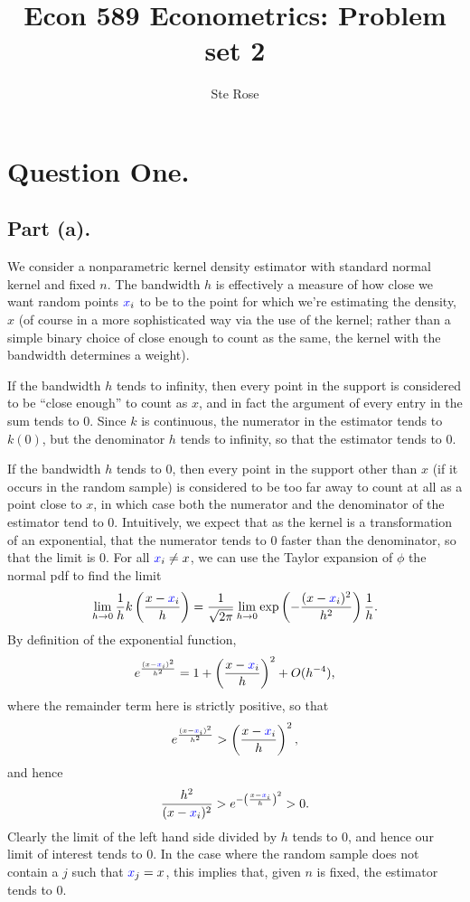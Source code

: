 \documentclass{article}
\title{Econ 589 Econometrics: Problem set 2}
\author{Ste Rose}
\renewcommand{\r}[1]{\textcolor{blue}{#1}}
\begin{document}
\newtheorem{claim}{Claim}
\newtheorem{thm}{Theorem}
\newtheorem{mydef}{Definition}
\maketitle

\section{Question One.}
\subsection{Part (a).}
We consider a nonparametric kernel density estimator with standard normal kernel and fixed $n$. The bandwidth $h$ is effectively a measure of how close we want random points $\r{x}_{i}$ to be to the point for which we're estimating the density, $x$ (of course in a more sophisticated way via the use of the kernel; rather than a simple binary choice of close enough to count as the same, the kernel with the bandwidth determines a weight).

If the bandwidth $h$ tends to infinity, then every point in the support is considered to be ``close enough'' to count as $x$, and in fact the argument of every entry in the sum tends to $0$. Since $k$ is continuous, the numerator in the estimator tends to $k(0)$, but the denominator $h$ tends to infinity, so that the estimator tends to 0.

If the bandwidth $h$ tends to 0, then every point in the support other than $x$ (if it occurs in the random sample) is considered to be too far away to count at all as a point close to $x$, in which case both the numerator and the denominator of the estimator tend to 0. Intuitively, we expect that as the kernel is a transformation of an exponential, that the numerator tends to 0 faster than the denominator, so that the limit is 0. For all $\r{x}_{i}\neq x$, we can use the Taylor expansion of $\phi$ the normal pdf to find the limit
\begin{equation} \lim_{h\to0} \frac{1}{h}k\left(\frac{x-\r{x}_{i}}{h}\right)=\frac{1}{\sqrt{2\pi}}\lim_{h\to0}\exp\left(-\frac{(x-\r{x}_{i})^{2}}{h^{2}}\right)\frac{1}{h}.
\end{equation}
By definition of the exponential function,
\begin{equation} e^{\frac{(x-\r{x}_{i})^{2}}{h^{2}}}=1+\left(\frac{x-\r{x}_{i}}{h}\right)^{2}+O(h^{-4}),\end{equation}
where the remainder term here is strictly positive, so that
\begin{equation} e^{\frac{(x-\r{x}_{i})^{2}}{h^{2}}}>\left(\frac{x-\r{x}_{i}}{h}\right)^{2},\end{equation}
and hence 
\begin{equation} \frac{h^{2}}{(x-\r{x}_{i})^{2}}>e^{-\left(\frac{x-\r{x}_{i}}{h}\right)^{2}}>0.\end{equation}
Clearly the limit of the left hand side divided by $h$ tends to 0, and hence our limit of interest tends to 0. In the case where the random sample does not contain a $j$ such that $\r{x}_{j}=x$, this implies that, given $n$ is fixed, the estimator tends to 0.
\end{document}
